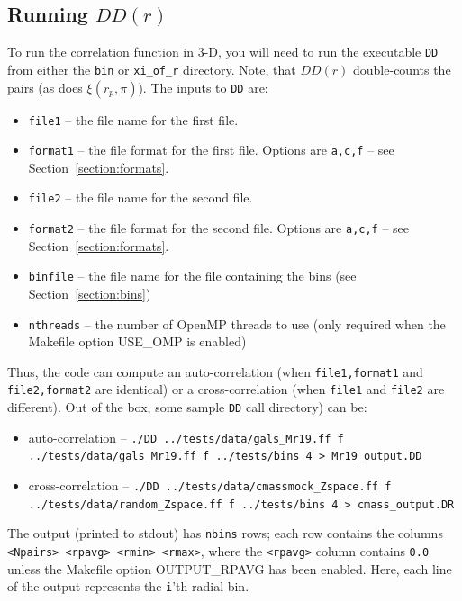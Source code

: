 \documentclass[12pt,titlepage]{article}
\newcommand{\xir}{\ensuremath{{DD(r)}}\xspace}
\newcommand{\xirppi}{\ensuremath{{\xi(r_p,\pi)}}\xspace}
\begin{document}
\subsection{Running \texorpdfstring{\xir}{xi(r)}}
To run the correlation function in 3-D, you will need to run the executable \texttt{DD} from either the \texttt{bin} or \texttt{xi\_of\_r} directory. Note, that 
\xir double-counts the pairs (as does \xirppi). The inputs to \texttt{DD} are:
\begin{itemize}
\item \texttt{file1}   -- the file name for the first file.
\item \texttt{format1} -- the file format for the first file. Options are \texttt{a,c,f} -- see Section~\ref{section:formats}.
\item \texttt{file2}   -- the file name for the second file.
\item \texttt{format2} -- the file format for the second file. Options are \texttt{a,c,f} -- see Section~\ref{section:formats}.
\item \texttt{binfile} -- the file name for the file containing the bins (see Section~\ref{section:bins})
\item \texttt{nthreads} -- the number of OpenMP threads to use (only required when the Makefile option USE\_OMP is enabled)
\end{itemize}
Thus, the code can compute an auto-correlation (when \texttt{file1,format1} and \texttt{file2,format2} are identical) or a cross-correlation (when \texttt{file1} and \texttt{file2} are different). Out of the box, 
some sample \texttt{DD} call directory) can be:
\begin{itemize}
\item auto-correlation --  {\scriptsize \texttt{./DD  ../tests/data/gals\_Mr19.ff f ../tests/data/gals\_Mr19.ff f ../tests/bins 4 > Mr19\_output.DD}}
\item cross-correlation -- {\scriptsize \texttt{./DD ../tests/data/cmassmock\_Zspace.ff f ../tests/data/random\_Zspace.ff f ../tests/bins 4 > cmass\_output.DR}}
\end{itemize}
The output (printed to stdout) has \texttt{nbins} rows; each row contains the columns \texttt{<Npairs> <rpavg> <rmin> <rmax>}, where the \texttt{<rpavg>} column contains \texttt{0.0} unless the 
Makefile option OUTPUT\_RPAVG has been enabled. Here, each line of the output represents the \texttt{i}'th radial bin. 
\end{document}
